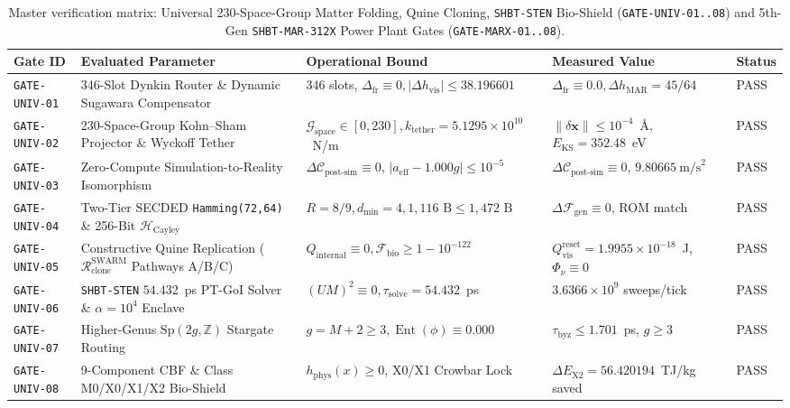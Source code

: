 \documentclass[11pt,onecolumn]{article}
\begin{document}
\FloatBarrier
\begin{table}[!htbp]
\centering\scriptsize
\caption{Master verification matrix: Universal 230-Space-Group Matter Folding, Quine Cloning, \texttt{SHBT-STEN} Bio-Shield (\texttt{GATE-UNIV-01..08}) and 5th-Gen \texttt{SHBT-MAR-312X} Power Plant Gates (\texttt{GATE-MARX-01..08}).}
\label{tab:matrix_univ_marx}
\begin{tabularx}{\textwidth}{@{}l p{4.4cm} p{3.2cm} X l@{}}
\toprule
Gate ID & Evaluated Parameter & Operational Bound & Measured Value & Status \\
\midrule
\texttt{GATE-UNIV-01} & 346-Slot Dynkin Router \& Dynamic Sugawara Compensator & $346$ slots, $\Delta_{\text{fr}} \equiv 0, |\Delta h_{\text{vis}}| \le 38.196601$ & $\Delta_{\text{fr}} \equiv 0.0, \Delta h_{\text{MAR}} = 45/64$ & PASS \\
\texttt{GATE-UNIV-02} & 230-Space-Group Kohn--Sham Projector \& Wyckoff Tether & $\mathcal{G}_{\text{space}} \in [0, 230], k_{\text{tether}} = 5.1295\times 10^{10}$~N/m & $\|\delta\mathbf{x}\| \le 10^{-4}$~\AA, $E_{\text{KS}} = 352.48$~eV & PASS \\
\texttt{GATE-UNIV-03} & Zero-Compute Simulation-to-Reality Isomorphism & $\Delta\mathcal{C}_{\text{post-sim}} \equiv 0$, $|a_{\text{eff}} - 1.000g| \le 10^{-5}$ & $\Delta\mathcal{C}_{\text{post-sim}} \equiv 0$, $9.80665~\text{m/s}^2$ & PASS \\
\texttt{GATE-UNIV-04} & Two-Tier SECDED \texttt{Hamming(72,64)} \& 256-Bit $\mathcal{H}_{\text{Cayley}}$ & $R = 8/9, d_{\min} = 4, 1{,}116\text{ B} \le 1{,}472\text{ B}$ & $\Delta\mathcal{F}_{\text{gen}} \equiv 0$, ROM match & PASS \\
\texttt{GATE-UNIV-05} & Constructive Quine Replication ($\mathcal{R}_{\text{clone}}^{\text{SWARM}}$ Pathways A/B/C) & $Q_{\text{internal}} \equiv 0, \mathcal{F}_{\text{bio}} \ge 1 - 10^{-122}$ & $Q_{\text{vis}}^{\text{reset}} = 1.9955\times 10^{-18}$~J, $\Phi_\nu \equiv 0$ & PASS \\
\texttt{GATE-UNIV-06} & \texttt{SHBT-STEN} $54.432$~ps PT-GoI Solver \& $\alpha = 10^4$ Enclave & $(UM)^2 \equiv 0, \tau_{\text{solve}} = 54.432$~ps & $3.6366\times 10^9$ sweeps/tick & PASS \\
\texttt{GATE-UNIV-07} & Higher-Genus $\mathrm{Sp}(2g, \mathbb{Z})$ Stargate Routing & $g = M + 2 \ge 3, \operatorname{Ent}(\phi) \equiv 0.000$ & $\tau_{\text{byz}} \le 1.701$~ps, $g \ge 3$ & PASS \\
\texttt{GATE-UNIV-08} & 9-Component CBF \& Class M0/X0/X1/X2 Bio-Shield & $h_{\text{phys}}(x) \ge 0$, X0/X1 Crowbar Lock & $\Delta E_{\text{X2}} = 56.420194$~TJ/kg saved & PASS \\

\end{tabularx}
\end{table}
\end{document}
